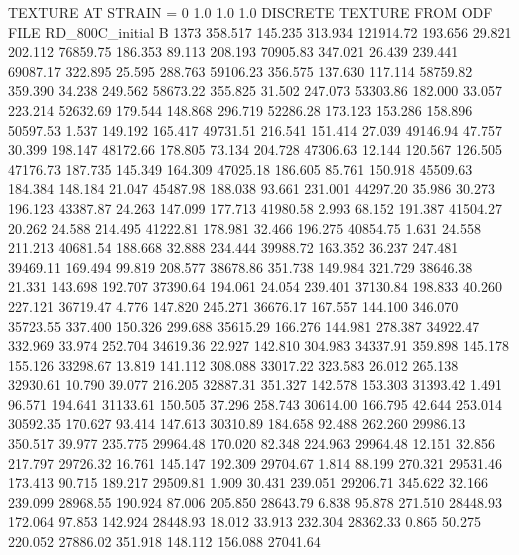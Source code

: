 TEXTURE AT STRAIN = 0
1.0   1.0   1.0
DISCRETE TEXTURE FROM ODF FILE RD_800C_initial
B 1373
 358.517  145.235  313.934    121914.72
 193.656   29.821  202.112     76859.75
 186.353   89.113  208.193     70905.83
 347.021   26.439  239.441     69087.17
 322.895   25.595  288.763     59106.23
 356.575  137.630  117.114     58759.82
 359.390   34.238  249.562     58673.22
 355.825   31.502  247.073     53303.86
 182.000   33.057  223.214     52632.69
 179.544  148.868  296.719     52286.28
 173.123  153.286  158.896     50597.53
   1.537  149.192  165.417     49731.51
 216.541  151.414   27.039     49146.94
  47.757   30.399  198.147     48172.66
 178.805   73.134  204.728     47306.63
  12.144  120.567  126.505     47176.73
 187.735  145.349  164.309     47025.18
 186.605   85.761  150.918     45509.63
 184.384  148.184   21.047     45487.98
 188.038   93.661  231.001     44297.20
  35.986   30.273  196.123     43387.87
  24.263  147.099  177.713     41980.58
   2.993   68.152  191.387     41504.27
  20.262   24.588  214.495     41222.81
 178.981   32.466  196.275     40854.75
   1.631   24.558  211.213     40681.54
 188.668   32.888  234.444     39988.72
 163.352   36.237  247.481     39469.11
 169.494   99.819  208.577     38678.86
 351.738  149.984  321.729     38646.38
  21.331  143.698  192.707     37390.64
 194.061   24.054  239.401     37130.84
 198.833   40.260  227.121     36719.47
   4.776  147.820  245.271     36676.17
 167.557  144.100  346.070     35723.55
 337.400  150.326  299.688     35615.29
 166.276  144.981  278.387     34922.47
 332.969   33.974  252.704     34619.36
  22.927  142.810  304.983     34337.91
 359.898  145.178  155.126     33298.67
  13.819  141.112  308.088     33017.22
 323.583   26.012  265.138     32930.61
  10.790   39.077  216.205     32887.31
 351.327  142.578  153.303     31393.42
   1.491   96.571  194.641     31133.61
 150.505   37.296  258.743     30614.00
 166.795   42.644  253.014     30592.35
 170.627   93.414  147.613     30310.89
 184.658   92.488  262.260     29986.13
 350.517   39.977  235.775     29964.48
 170.020   82.348  224.963     29964.48
  12.151   32.856  217.797     29726.32
  16.761  145.147  192.309     29704.67
   1.814   88.199  270.321     29531.46
 173.413   90.715  189.217     29509.81
   1.909   30.431  239.051     29206.71
 345.622   32.166  239.099     28968.55
 190.924   87.006  205.850     28643.79
   6.838   95.878  271.510     28448.93
 172.064   97.853  142.924     28448.93
  18.012   33.913  232.304     28362.33
   0.865   50.275  220.052     27886.02
 351.918  148.112  156.088     27041.64
